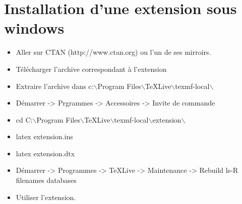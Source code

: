 \section{Installation d'une extension sous windows}

\vfill
\begin{itemize}
\item Aller sur CTAN (http://www.ctan.org) ou l'un de ses mirroirs.
\item Télécharger l'archive correspondant à l'extension
\item Extraire l'archive dans c:$\backslash$Program
  Files$\backslash$TeXLive$\backslash$texmf-local$\backslash$
\item Démarrer -> Prgrammes -> Accessoires -> Invite de commande
\item cd C:$\backslash$Program Files$\backslash$TeXLive$\backslash$texmf-local$\backslash$extension$\backslash$
\item latex extension.ins
\item latex extension.dtx
\item Démarrer -> Programmes -> TeXLive -> Maintenance -> Rebuild ls-R filenames databases
\item Utiliser l'extension.
\end{itemize}
\vfill

